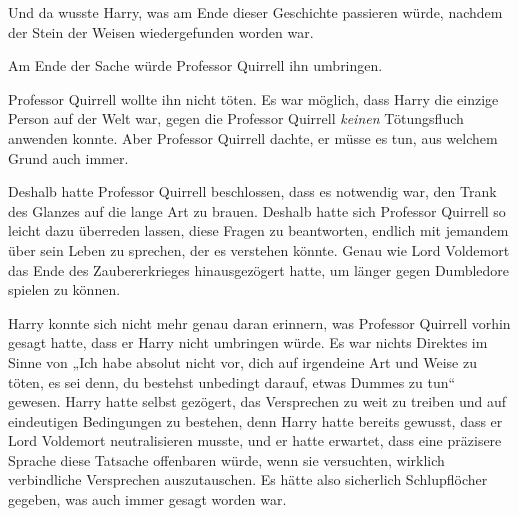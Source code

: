 Und da wusste Harry, was am Ende dieser Geschichte passieren würde, nachdem der Stein der Weisen wiedergefunden worden war.

Am Ende der Sache würde Professor Quirrell ihn umbringen.

Professor Quirrell wollte ihn nicht töten. Es war möglich, dass Harry die einzige Person auf der Welt war, gegen die Professor Quirrell \emph{keinen} Tötungsfluch anwenden konnte. Aber Professor Quirrell dachte, er müsse es tun, aus welchem Grund auch immer.

Deshalb hatte Professor Quirrell beschlossen, dass es notwendig war, den Trank des Glanzes auf die lange Art zu brauen. Deshalb hatte sich Professor Quirrell so leicht dazu überreden lassen, diese Fragen zu beantworten, endlich mit jemandem über sein Leben zu sprechen, der es verstehen könnte. Genau wie Lord Voldemort das Ende des Zaubererkrieges hinausgezögert hatte, um länger gegen Dumbledore spielen zu können.

Harry konnte sich nicht mehr genau daran erinnern, was Professor Quirrell vorhin gesagt hatte, dass er Harry nicht umbringen würde. Es war nichts Direktes im Sinne von
„Ich habe absolut nicht vor, dich auf irgendeine Art und Weise zu töten, es sei denn, du bestehst unbedingt darauf, etwas Dummes zu tun“ gewesen. Harry hatte selbst gezögert, das Versprechen zu weit zu treiben und auf eindeutigen Bedingungen zu bestehen, denn Harry hatte bereits gewusst, dass er Lord Voldemort neutralisieren musste, und er hatte erwartet, dass eine präzisere Sprache diese Tatsache offenbaren würde, wenn sie versuchten, wirklich verbindliche Versprechen auszutauschen.
Es hätte also sicherlich Schlupflöcher gegeben, was auch immer gesagt worden war.

